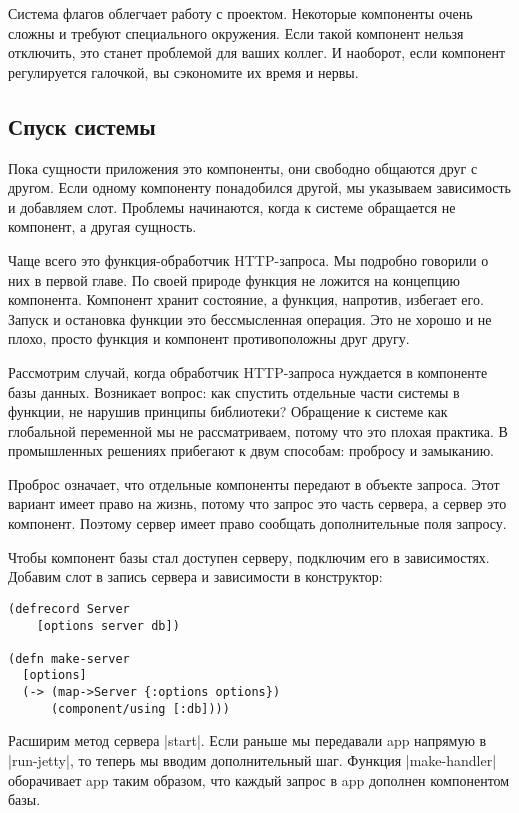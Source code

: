 Система флагов облегчает работу с проектом. Некоторые компоненты очень сложны и
требуют специального окружения. Если такой компонент нельзя отключить, это
станет проблемой для ваших коллег. И наоборот, если компонент регулируется
галочкой, вы сэкономите их время и нервы.

\subsection{Спуск системы}

Пока сущности приложения это компоненты, они свободно общаются друг с
другом. Если одному компоненту понадобился другой, мы указываем зависимость и
добавляем слот. Проблемы начинаются, когда к системе обращается не компонент, а
другая сущность.

Чаще всего это функция-обработчик HTTP-запроса. Мы подробно говорили о них в
первой главе. По своей природе функция не ложится на концепцию
компонента. Компонент хранит состояние, а функция, напротив, избегает
его. Запуск и остановка функции это бессмысленная операция. Это не хорошо и не
плохо, просто функция и компонент противоположны друг другу.

Рассмотрим случай, когда обработчик HTTP-запроса нуждается в компоненте базы
данных. Возникает вопрос: как спустить отдельные части системы в функции, не
нарушив принципы библиотеки? Обращение к системе как глобальной переменной мы не
рассматриваем, потому что это плохая практика. В промышленных решениях прибегают
к двум способам: пробросу и замыканию.

Проброс означает, что отдельные компоненты передают в объекте запроса. Этот
вариант имеет право на жизнь, потому что запрос это часть сервера, а сервер это
компонент. Поэтому сервер имеет право сообщать дополнительные поля запросу.

Чтобы компонент базы стал доступен серверу, подключим его в
зависимостях. Добавим слот в запись сервера и зависимости в конструктор:

\begin{verbatim}
(defrecord Server
    [options server db])

(defn make-server
  [options]
  (-> (map->Server {:options options})
      (component/using [:db])))
\end{verbatim}

Расширим метод сервера \spverb|start|. Если раньше мы передавали app напрямую в
\spverb|run-jetty|, то теперь мы вводим дополнительный шаг. Функция \spverb|make-handler|
оборачивает app таким образом, что каждый запрос в app дополнен компонентом
базы.


